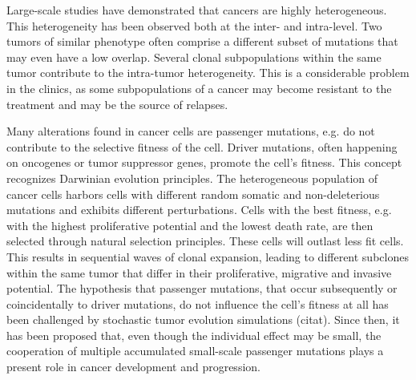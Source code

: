     Large-scale studies have demonstrated that cancers are highly heterogeneous.
    This heterogeneity has been observed both at the inter- and intra-level. Two
    tumors of similar phenotype often comprise a different subset of mutations
    that may even have a low overlap. Several clonal subpopulations within the
    same tumor contribute to the intra-tumor heterogeneity. This is a
    considerable problem in the clinics, as some subpopulations of a cancer may
    become resistant to the  treatment and may be the source of relapses.

    Many alterations found in cancer cells are passenger mutations, e.g. do not
    contribute to the selective fitness of the cell. Driver mutations, often
    happening on oncogenes or tumor suppressor genes, promote the cell's
    fitness. This concept recognizes Darwinian evolution principles. The
    heterogeneous  population of cancer cells harbors cells with different
    random somatic and non-deleterious mutations and exhibits different
    perturbations. Cells with the best fitness, e.g. with the highest
    proliferative potential  and the lowest death rate, are then selected
    through natural selection principles. These cells will outlast less fit
    cells. This results in  sequential waves of clonal expansion, leading to
    different subclones within the same tumor that differ in their
    proliferative, migrative and invasive potential. The hypothesis that
    passenger mutations, that occur subsequently or coincidentally to driver
    mutations, do not influence the cell's fitness at all has been
    challenged by stochastic tumor evolution simulations (citat). Since then,
    it has been proposed that, even though the individual effect may be
    small, the cooperation of multiple accumulated small-scale passenger
    mutations plays a present role in cancer development and progression.

